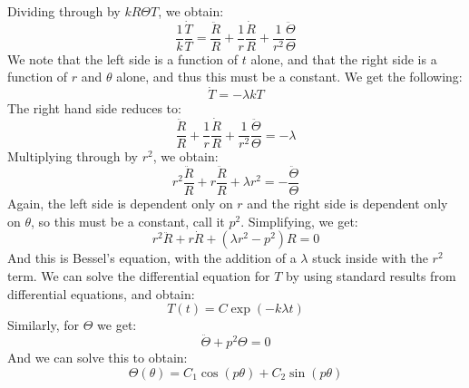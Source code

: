 \documentclass[crop=false,class=book,oneside]{standalone}
\begin{document}
            Dividing through by $kR\Theta{T}$, we obtain:
            \begin{equation}
                \frac{1}{k}\frac{\dot{T}}{T}=
                \frac{\ddot{R}}{R}+\frac{1}{r}\frac{\dot{R}}{R}+
                \frac{1}{r^{2}}\frac{\ddot{\Theta}}{\Theta}
            \end{equation}
            We note that the left side is a function of $t$
            alone, and that the right side is a function of $r$
            and $\theta$ alone, and thus this must be a constant.
            We get the following:
            \begin{equation}
                \dot{T}=\minus\lambda{k}T
            \end{equation}
            The right hand side reduces to:
            \begin{equation}
                \frac{\ddot{R}}{R}+\frac{1}{r}\frac{\dot{R}}{R}+
                \frac{1}{r^{2}}\frac{\ddot{\Theta}}{\Theta}
                =\minus\lambda
            \end{equation}
            Multiplying through by $r^{2}$, we obtain:
            \begin{equation}
                r^{2}\frac{\ddot{R}}{R}+r\frac{\ddot{R}}{R}+
                \lambda{r}^{2}=\minus\frac{\ddot{\Theta}}{\Theta}
            \end{equation}
            Again, the left side is dependent only on $r$ and
            the right side is dependent only on $\theta$, so this
            must be a constant, call it $p^{2}$. Simplifying, we
            get:
            \begin{equation}
                r^{2}\ddot{R}+r\dot{R}+(\lambda{r}^{2}-p^{2})R=0
            \end{equation}
            And this is Bessel's equation, with the addition of
            a $\lambda$ stuck inside with the $r^{2}$ term. We
            can solve the differential equation for $T$ by using
            standard results from differential equations, and obtain:
            \begin{equation}
                T(t)=C\exp(\minus{k}\lambda{t})
            \end{equation}
            Similarly, for $\Theta$ we get:
            \begin{equation}
                \ddot{\Theta}+p^{2}\Theta=0
            \end{equation}
            And we can solve this to obtain:
            \begin{equation}
                \Theta(\theta)=C_{1}\cos(p\theta)+C_{2}\sin(p\theta)
            \end{equation}
\end{document}
